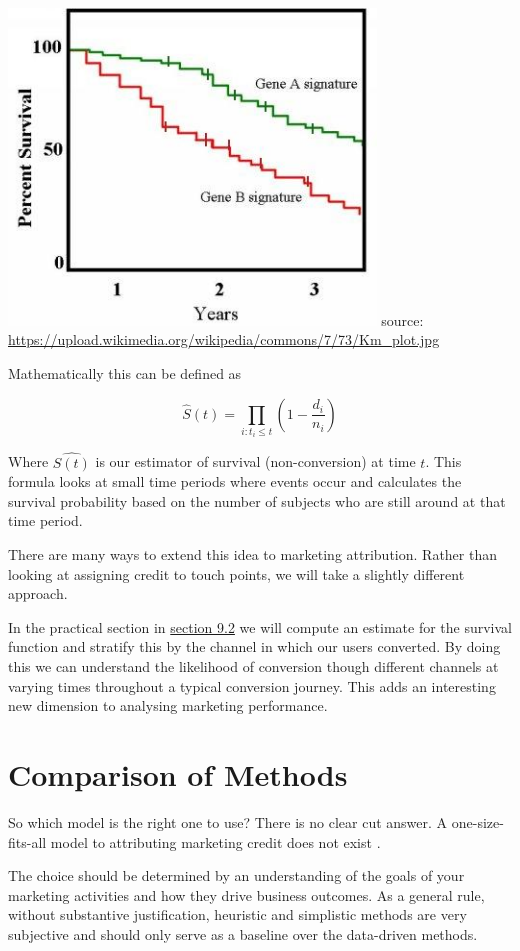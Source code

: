 \documentclass[]{book}
\begin{document}
\includegraphics[width=3.84in]{img/Km_plot} source:
\url{https://upload.wikimedia.org/wikipedia/commons/7/73/Km_plot.jpg}

Mathematically this can be defined as

\[
\hat{S}(t) = \prod\limits_{i: t_i \leq{t}} (1 - \frac{d_i}{n_i})
\]

Where \(\hat{S(t)}\) is our estimator of survival (non-conversion) at
time \(t\). This formula looks at small time periods where events occur
and calculates the survival probability based on the number of subjects
who are still around at that time period.

There are many ways to extend this idea to marketing attribution. Rather
than looking at assigning credit to touch points, we will take a
slightly different approach.

In the practical section in
\protect\hyperlink{survival-analysis}{section 9.2} we will compute an
estimate for the survival function and stratify this by the channel in
which our users converted. By doing this we can understand the
likelihood of conversion though different channels at varying times
throughout a typical conversion journey. This adds an interesting new
dimension to analysing marketing performance.

\section{Comparison of Methods}\label{comparison-of-methods}

So which model is the right one to use? There is no clear cut answer. A
one-size-fits-all model to attributing marketing credit does not exist
\citep{shao2011data}.

The choice should be determined by an understanding of the goals of your
marketing activities and how they drive business outcomes. As a general
rule, without substantive justification, heuristic and simplistic
methods are very subjective and should only serve as a baseline over the
data-driven methods.
\end{document}
